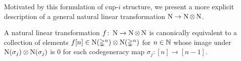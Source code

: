 \iffalse
\begin{proof}
	Let $C^\vee = \Hom(C, \F)$ with $C$ a finite dimensional chain complex.
	Using the hom-tensor adjunction and the finite dimensionality of $C$ we have
	\begin{align*}
	\Hom \big(W \ot_{\F[\Sym_2]} (C^\vee)^{\ot 2}, C^\vee \big) & \cong
	\Hom_{\F[\Sym_2]} \big( W, \Hom((C^\vee)^{\ot 2}, C^\vee) \big) \\ & \cong
	\Hom_{\F[\Sym_2]} \big( W, \Hom(C, C^{\ot 2}) \big)
	\end{align*}
	as chain complexes of $\F$-modules.
	In other words, the linear duality functor induces a bijection between cup-$i$ product structures on $C^\vee$ and $\F[\Sym_2]$-linear chain maps $\triangle \colon W \to \Hom(C, C^{\ot 2})$.
	The latter are canonically equivalent to linear maps $\triangle_i = \triangle(e_i)$ satisfying that $\triangle_0$ is a chain map and
	\[
	\bd \circ \, \triangle_i + \triangle_i \circ \bd =
	(1+T) \triangle_{i-1}
	\]
	for all $i > 0$ since
	\begin{align*}
	\bd \triangle (e_i) + \triangle \bd(e_i) &=
	\bd \triangle (e_i) + \triangle (1+T) (e_{i-1}) \\ &=
	\bd \circ \, \triangle_i + \triangle_i \circ \bd \ +\ (1+T) \triangle_{i-1}.
	\end{align*}

	By naturality, a cup-$i$ structure is determined by its restriction to representable simplicial sets $\simplex^n$.
	Since $\chains(\simplex^n)$ is finite dimensional, the previous argument involving only canonical equivalences proves the claim.
\end{proof}
\fi

Motivated by this formulation of cup-$i$ structure, we present a more explicit description of a general natural linear transformation $\operatorname{N} \to \operatorname{N} \otimes \operatorname{N}$.

\begin{lemma} \label{l:natural linear map}
	A natural linear transformation $f \colon \operatorname{N} \to \operatorname{N} \otimes \operatorname{N}$ is canonically equivalent to a collection of elements $f[n] \in \operatorname{N}(\mathbb{\Delta}^n) \otimes \operatorname{N}(\mathbb{\Delta}^n)$
	for $n \in \mathbb{N}$ whose image under $\operatorname{N}(\sigma_j) \otimes \operatorname{N}(\sigma_j)$ is $0$
	for each codegeneracy map $\sigma_j \colon [n] \to [n-1]$.
\end{lemma}

